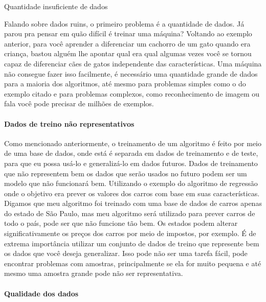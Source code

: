 \documentclass[
  letterpaper,
  DIV=11,
  numbers=noendperiod]{scrreprt}
\let\oldparagraph\paragraph
\renewcommand{\paragraph}[1]{\oldparagraph{#1}\mbox{}}
\begin{document}
Quantidade insuficiente de dados

Falando sobre dados ruins, o primeiro problema é a quantidade de dados.
Já parou pra pensar em quão difícil é treinar uma máquina? Voltando ao
exemplo anterior, para você aprender a diferenciar um cachorro de um
gato quando era criança, bastou alguém lhe apontar qual era qual algumas
vezes você se tornou capaz de diferenciar cães de gatos independente das
características. Uma máquina não consegue fazer isso facilmente, é
necessário uma quantidade grande de dados para a maioria dos algoritmos,
até mesmo para problemas simples como o do exemplo citado e para
problemas complexos, como reconhecimento de imagem ou fala você pode
precisar de milhões de exemplos.

\hypertarget{dados-de-treino-nuxe3o-representativos}{%
\paragraph{Dados de treino não
representativos}\label{dados-de-treino-nuxe3o-representativos}}

Como mencionado anteriormente, o treinamento de um algoritmo é feito por
meio de uma base de dados, onde está é separada em dados de treinamento
e de teste, para que eu possa usá-lo e generalizá-lo em dados futuros.
Dados de treinamento que não representem bem os dados que serão usados
no futuro podem ser um modelo que não funcionará bem. Utilizando o
exemplo do algoritmo de regressão onde o objetivo era prever os valores
dos carros com base em suas características. Digamos que meu algoritmo
foi treinado com uma base de dados de carros apenas do estado de São
Paulo, mas meu algoritmo será utilizado para prever carros de todo o
país, pode ser que não funcione tão bem. Os estados podem alterar
significativamente os preços dos carros por meio de impostos, por
exemplo. É de extrema importância utilizar um conjunto de dados de
treino que represente bem os dados que você deseja generalizar. Isso
pode não ser uma tarefa fácil, pode encontrar problemas com amostras,
principalmente se ela for muito pequena e até mesmo uma amostra grande
pode não ser representativa.

\hypertarget{qualidade-dos-dados}{%
\paragraph{Qualidade dos dados}\label{qualidade-dos-dados}}
\end{document}
